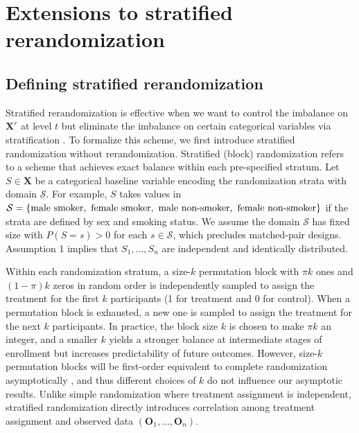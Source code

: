 \documentclass[12pt]{article}
\newcommand{\bX}{\boldsymbol{X}}\newcommand{\bO}{\boldsymbol{O}}
\begin{document}
{\section{Extensions to stratified rerandomization}\label{sec: stratified-reran}
\subsection{Defining stratified rerandomization}\label{subsec: st-reran}
Stratified rerandomization is effective when we want to control the imbalance on $\bX^r$ at level $t$ but eliminate the imbalance on certain categorical variables via stratification \citep{wang2023rerandomization}. 
To formalize this scheme, we first introduce stratified randomization without rerandomization. 
{Stratified (block) randomization refers to a scheme that achieves exact balance within each pre-specified stratum. Let $S \in \bX$ be a categorical baseline variable encoding the randomization strata with domain $\mathcal{S}$.
For example, $S$ takes values in $\mathcal{S}=\{\textup{male smoker},\ \textup{female smoker},\ \textup{male non-smoker},\ \textup{female non-smoker}\}$ if the strata are defined by sex and smoking status. We assume the domain $\mathcal{S}$ has fixed size with $P(S =s ) > 0$ for each $s \in \mathcal{S}$, which precludes matched-pair designs. Assumption 1 implies that $S_1,\dots, S_n$ are independent and identically distributed.   }

{Within each randomization stratum, a size-$k$ permutation block with $\pi k$ ones and $(1-\pi)k$ zeros in random order is independently sampled to assign the treatment for the first $k$ participants (1 for treatment and 0 for control). When a permutation block is exhausted, a new one is sampled to assign the treatment for the next $k$ participants. In practice, the block size $k$ is chosen to make $\pi k$ an integer, and a smaller $k$ yields a stronger balance at intermediate stages of enrollment but increases predictability of future outcomes. However, 
{size-$k$ permutation blocks will be first-order equivalent to complete randomization asymptotically \citep{bugni2018}, and thus different choices of $k$ do not influence our asymptotic results.}
Unlike simple randomization where treatment assignment is independent, stratified randomization directly introduces correlation among treatment assignment and observed data $(\bO_1,\dots, \bO_n)$.}

}
\end{document}

